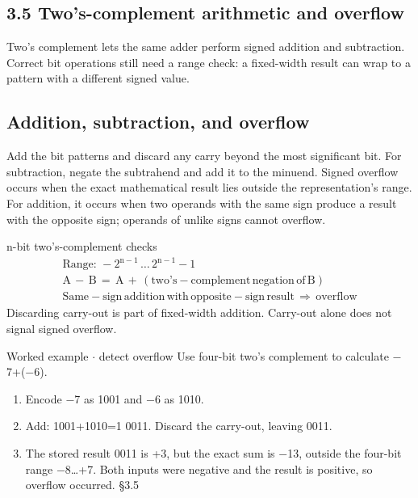 \documentclass[11pt]{article}
\begin{document}
\begin{keepsection}
\section{3.5 Two’s-complement arithmetic and overflow}

Two’s complement lets the same adder perform signed addition and subtraction. Correct bit operations still need a range check: a fixed-width result can wrap to a pattern with a different signed value.

\begin{keepsection}
\subsection{Addition, subtraction, and overflow}

Add the bit patterns and discard any carry beyond the most significant bit. For subtraction, negate the subtrahend and add it to the minuend. Signed overflow occurs when the exact mathematical result lies outside the representation’s range. For addition, it occurs when two operands with the same sign produce a result with the opposite sign; operands of unlike signs cannot overflow.

\begin{equationcard}{n-bit two’s-complement checks}
\[ \begin{gathered} \text{Range}:\, -2^{\mathrm{n}-1}\, …\, 2^{\mathrm{n}-1}-1 \\ \mathrm{A}\, -\, \mathrm{B}\, =\, \mathrm{A}\, +\, (\text{two}’\mathrm{s}-\text{complement}\, \text{negation}\, \text{of}\, \mathrm{B}) \\ \text{Same}-\text{sign}\, \text{addition}\, \text{with}\, \text{opposite}-\text{sign}\, \text{result}\, \Rightarrow \, \text{overflow} \end{gathered} \]
{\small Discarding carry-out is part of fixed-width addition. Carry-out alone does not signal signed overflow.}
\end{equationcard}

\begin{workedbox}{Worked example \ensuremath{\cdot} detect overflow}
Use four-bit two’s complement to calculate \ensuremath{-}7+(\ensuremath{-}6).

\begin{enumerate}
\item Encode \ensuremath{-}7 as 1001 and \ensuremath{-}6 as 1010.
\item Add: 1001+1010=1 0011. Discard the carry-out, leaving 0011.
\item The stored result 0011 is +3, but the exact sum is \ensuremath{-}13, outside the four-bit range \ensuremath{-}8…+7. Both inputs were negative and the result is positive, so overflow occurred. \hfill{\small\color{FAUblue}§3.5}
\end{enumerate}
\end{workedbox}
\end{keepsection}


\end{keepsection}
\end{document}
